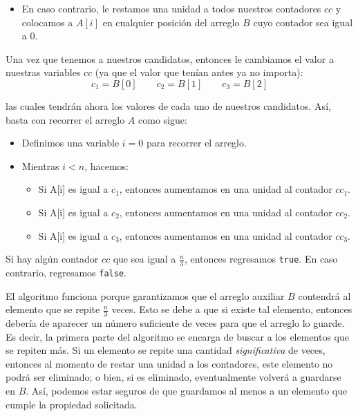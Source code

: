 \documentclass[letterpaper,11pt]{article}
\begin{document}
\begin{enumerate}
\begin{itemize}
\begin{itemize}
            \item En caso contrario, le restamos una unidad a todos nuestros 
            contadores $cc$ y colocamos a $A[i]$ en cualquier posición del arreglo 
            $B$ cuyo contador sea igual a $0$. 
        \end{itemize}
    \end{itemize}

    Una vez que tenemos a nuestros candidatos, entonces le cambiamos el valor a 
    nuestras variables $cc$ (ya que el valor que tenían antes ya no importa):
    \begin{equation*}
        c_1 = B[0] \quad \quad c_2 = B[1] \quad \quad c_3 = B[2]
    \end{equation*} 
    
    las cuales tendrán ahora los valores de cada uno de nuestros candidatos. 
    Así, basta con recorrer el arreglo $A$ como sigue:
    \begin{itemize}
        \item Definimos una variable $i=0$ para recorrer el arreglo.

        \item Mientras $i < n$, hacemos:
        \begin{itemize}
            \item Si A[i] es igual a $c_1$, entonces aumentamos en una unidad 
            al contador $cc_1$.

            \item Si A[i] es igual a $c_2$, entonces aumentamos en una unidad 
            al contador $cc_2$.

            \item Si A[i] es igual a $c_3$, entonces aumentamos en una unidad 
            al contador $cc_3$.
        \end{itemize}
    \end{itemize}

    Si hay algún contador $cc$ que sea igual a $\frac{n}{3}$, entonces 
    regresamos \texttt{true}. En caso contrario, regresamos \texttt{false}.

    El algoritmo funciona porque garantizamos que el arreglo auxiliar $B$ 
    contendrá al elemento que se repite $\frac{n}{3}$ veces. Esto se debe a 
    que si existe tal elemento, entonces debería de aparecer un número 
    suficiente de veces para que el arreglo lo guarde. Es decir, la primera 
    parte del algoritmo se encarga de buscar a los elementos que se repiten 
    más. Si un elemento se repite una cantidad \textit{significativa} de 
    veces, entonces al momento de restar una unidad a los contadores, 
    este elemento no podrá ser eliminado; o bien, si es eliminado, 
    eventualmente volverá a guardarse en $B$. Así, podemos estar seguros 
    de que guardamos al menos a un elemento que cumple la propiedad solicitada.


\end{enumerate}
\end{document}
